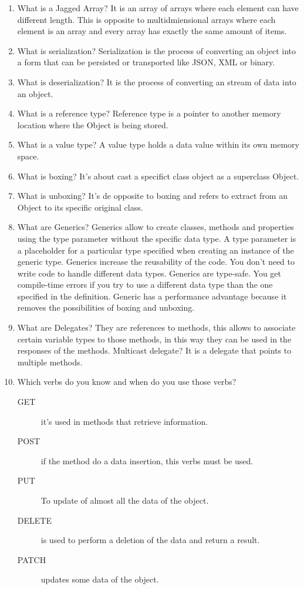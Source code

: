 \begin{multicols}{2}
\begin{enumerate}
\item What is a Jagged Array? It is an array of arrays where each element can have different length. This is opposite to multidmiensional arrays where each element is an array and every array has exactly the same amount of items.

\item What is serialization? Serialization is the process of converting an object into a form that can be persisted or transported like JSON, XML or binary.

\item What is deserialization? It is the process of converting an stream of data into an object.

\item What is a reference type? Reference type is a pointer to another memory location where the Object is being stored.

\item What is a value type? A value type holds a data value within its own memory space.

\item What is boxing? It's about cast a specifict class object as a superclass Object.

\item What is unboxing? It's de opposite to boxing and refers to extract from an Object to its specific original class.

\item What are Generics? Generics allow to create classes, methods and properties using the type parameter without the specific data type. A type parameter is a placeholder for a particular type specified when creating an instance of the generic type. Generics increase the reusability of the code. You don't need to write code to handle different data types. Generics are type-safe. You get compile-time errors if you try to use a different data type than the one specified in the definition.
Generic has a performance advantage because it removes the possibilities of boxing and unboxing.

\item What are Delegates? They are references to methods, this allows to associate certain variable types to those methods, in this way they can be used in the responses of the methods. Multicast delegate? It is a delegate that points to multiple methods.

\item Which verbs do you know and when do you use those verbs?
\begin{description}
\item[GET] it's used in methods that retrieve information.
\item[POST] if the method do a data insertion, this verbs must be used.
\item[PUT] To update of almost all the data of the object.
\item[DELETE] is used to perform a deletion of the data and return a result.
\item[PATCH] updates some data of the object.
\end{description}


\end{enumerate}
\end{multicols}
